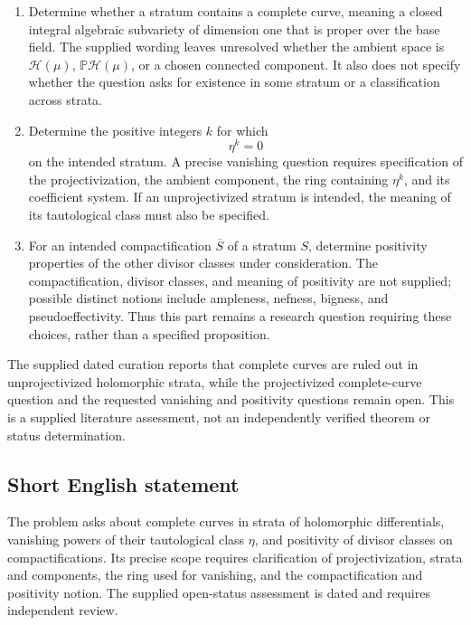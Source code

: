 \documentclass[11pt]{article}
\begin{document}
\begin{enumerate}
\item Determine whether a stratum contains a complete curve, meaning a closed integral algebraic subvariety of dimension one that is proper over the base field. The supplied wording leaves unresolved whether the ambient space is \(\mathcal H(\mu)\), \(\mathbb P\mathcal H(\mu)\), or a chosen connected component. It also does not specify whether the question asks for existence in some stratum or a classification across strata.
\item Determine the positive integers \(k\) for which
\[
\eta^k=0
\]
on the intended stratum. A precise vanishing question requires specification of the projectivization, the ambient component, the ring containing \(\eta^k\), and its coefficient system. If an unprojectivized stratum is intended, the meaning of its tautological class must also be specified.
\item For an intended compactification \(\overline S\) of a stratum \(S\), determine positivity properties of the other divisor classes under consideration. The compactification, divisor classes, and meaning of positivity are not supplied; possible distinct notions include ampleness, nefness, bigness, and pseudoeffectivity. Thus this part remains a research question requiring these choices, rather than a specified proposition.
\end{enumerate}

The supplied dated curation reports that complete curves are ruled out in unprojectivized holomorphic strata, while the projectivized complete-curve question and the requested vanishing and positivity questions remain open. This is a supplied literature assessment, not an independently verified theorem or status determination.
\subsection{Short English statement}
The problem asks about complete curves in strata of holomorphic differentials, vanishing powers of their tautological class \(\eta\), and positivity of divisor classes on compactifications. Its precise scope requires clarification of projectivization, strata and components, the ring used for vanishing, and the compactification and positivity notion. The supplied open-status assessment is dated and requires independent review.
\end{document}
